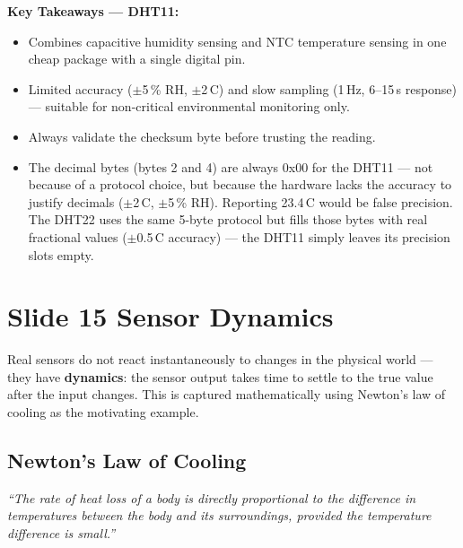 \documentclass[12pt, a4paper]{article}
\begin{document}
\begin{keybox}
  \textbf{Key Takeaways --- DHT11:}
  \begin{itemize}[leftmargin=1.5em, topsep=2pt]
    \item Combines capacitive humidity sensing and NTC temperature sensing
          in one cheap package with a single digital pin.
    \item Limited accuracy ($\pm$5\,\% RH, $\pm$2\,\textdegree{}C) and
          slow sampling (1\,Hz, 6--15\,s response) --- suitable for
          non-critical environmental monitoring only.
    \item Always validate the checksum byte before trusting the reading.
    \item The decimal bytes (bytes 2 and 4) are always 0x00 for the DHT11
          --- not because of a protocol choice, but because the hardware
          lacks the accuracy to justify decimals ($\pm$2\,\textdegree{}C,
          $\pm$5\,\% RH). Reporting 23.4\,\textdegree{}C would be false
          precision. The DHT22 uses the same 5-byte protocol but fills
          those bytes with real fractional values ($\pm$0.5\,\textdegree{}C
          accuracy) --- the DHT11 simply leaves its precision slots empty.
  \end{itemize}
\end{keybox}

\section*{Slide 15 \quad Sensor Dynamics}

Real sensors do not react instantaneously to changes in the physical world ---
they have \textbf{dynamics}: the sensor output takes time to settle to the
true value after the input changes. This is captured mathematically using
Newton's law of cooling as the motivating example.

\subsection*{Newton's Law of Cooling}

\textit{``The rate of heat loss of a body is directly proportional to the
difference in temperatures between the body and its surroundings, provided
the temperature difference is small.''}
\end{document}

